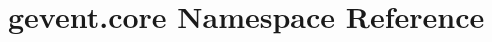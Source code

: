 \hypertarget{namespacegevent_1_1core}{}\section{gevent.\+core Namespace Reference}
\label{namespacegevent_1_1core}

